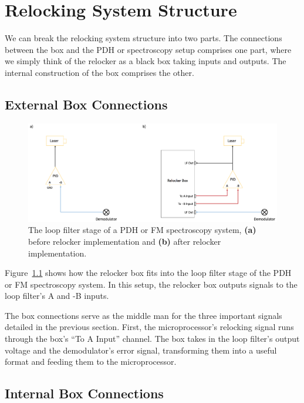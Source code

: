 \documentclass[10pt]{report}
\begin{document}
\chapter{Relocking System Structure}\label{chap:relockingSystemStructure}

We can break the relocking system structure into two parts. The connections between the box and the PDH or spectroscopy setup comprises one part, where we simply think of the relocker as a black box taking inputs and outputs. The internal construction of the box comprises the other.

\section{External Box Connections}
\label{sect:externalBoxConnections}

\begin{figure}[h]
    \centering
    \includegraphics[width=\textwidth]{includes/relockerExtStructure.png}
    \caption{The loop filter stage of a PDH or FM spectroscopy system, \textbf{(a)} before relocker implementation and \textbf{(b)} after relocker implementation.}
    \label{fig:relockerExtStructure}
\end{figure}

Figure~\ref{fig:relockerExtStructure} shows how the relocker box fits into the loop filter stage of the PDH or FM spectroscopy system. In this setup, the relocker box outputs signals to the loop filter's A and -B inputs. 

The box connections serve as the middle man for the three important signals detailed in the previous section. First, the microprocessor's relocking signal runs through the box's ``To A Input'' channel. The box takes in the loop filter's output voltage and the demodulator's error signal, transforming them into a useful format and feeding them to the microprocessor.

\section{Internal Box Connections}
\label{sect:internalBoxConnections}
\end{document}
